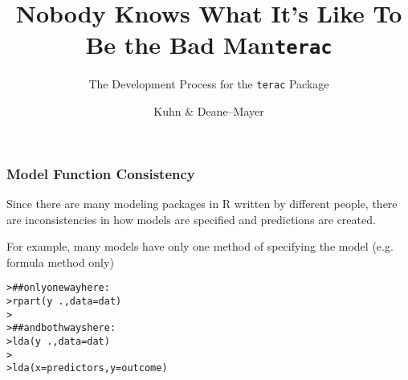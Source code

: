 \documentclass[12 pt]{beamer}\usepackage[]{graphicx}\usepackage[]{color}
\title{\large Nobody Knows What It's Like To Be the Bad Man}
\subtitle{The Development Process for the {\tt{terac}} Package}
\author[Subham Kuhn \& Deane--Mayer]
{%
   \texorpdfstring{
        \begin{columns}
            \column{.45\linewidth}
            \centering
            Max Kuhn\\
            Pfizer Global R$\&$D\\
            \href{mailto:max.kuhn@pfizer.com}{max.kuhn@pfizer.com}
            \column{.45\linewidth}
            \centering
            Zachary Deane--Mayer\\
            Cognius\\
            \href{mailto:zach.mayer@gmail.com}{zach.mayer@gmail.com}
        \end{columns}
   }
   {John Doe \& Jane Doe}
}
\date{}
\makeatletter
\newcommand{\hlcom}[1]{\textcolor[rgb]{0.588,0.588,0.588}{#1}}%
\newcommand{\hlopt}[1]{\textcolor[rgb]{0.196,0.196,0.196}{#1}}%
\newcommand{\hlstd}[1]{\textcolor[rgb]{0.196,0.196,0.196}{#1}}%
\newcommand{\hlkwc}[1]{\textcolor[rgb]{0,0.631,0.314}{#1}}%
\newcommand{\hlkwd}[1]{\textcolor[rgb]{0.78,0.227,0.412}{#1}}%
\newenvironment{kframe}{%
 \def\at@end@of@kframe{}%
 \ifinner\ifhmode%
  \def\at@end@of@kframe{\end{minipage}}%
  \begin{minipage}{\columnwidth}%
 \fi\fi%
 \def\FrameCommand##1{\hskip\@totalleftmargin \hskip-\fboxsep
 \colorbox{shadecolor}{##1}\hskip-\fboxsep
     \hskip-\linewidth \hskip-\@totalleftmargin \hskip\columnwidth}%
 \MakeFramed {\advance\hsize-\width
   \@totalleftmargin\z@ \linewidth\hsize
   \@setminipage}}%
 {\par\unskip\endMakeFramed%
 \at@end@of@kframe}
\newenvironment{knitrout}{}{} %
\makeatother
\begin{document}
\begin{frame}[plain]
  \maketitle
\end{frame}

\title{\tt{terac}}
\author{Kuhn \& Deane--Mayer}


  \begin{frame}[fragile]
\frametitle{Model Function Consistency}

Since there are many modeling packages in R written by different people,
there are inconsistencies in how models are specified and
predictions are created.

\vspace{.15in}

For example, many models have only one method of specifying the model
(e.g. formula method only)

\vspace{.1in}

\begin{knitrout}\scriptsize
{}\color{fgcolor}\begin{kframe}
\begin{alltt}
\hlstd{> }\hlcom{## only one way here:}
\hlstd{> }\hlkwd{rpart}\hlstd{(y} \hlopt{~} \hlstd{.,} \hlkwc{data} \hlstd{= dat)}
\hlstd{> }
\hlstd{> }\hlcom{## and both ways here:}
\hlstd{> }\hlkwd{lda}\hlstd{(y} \hlopt{~} \hlstd{.,} \hlkwc{data} \hlstd{= dat)}
\hlstd{> }
\hlstd{> }\hlkwd{lda}\hlstd{(}\hlkwc{x} \hlstd{= predictors,} \hlkwc{y} \hlstd{= outcome)}
\end{alltt}
\end{kframe}
\end{knitrout}

\end{frame}

\end{document}
